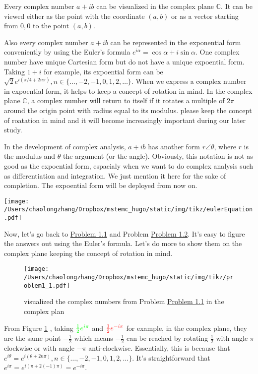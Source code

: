 \documentclass[koma,a4paper,utopia,12pt,listings-color,microtype,paralist,colorlinks,urlcolor=red]{org-article}
\begin{document}
Every complex number \(a+ib\) can be visualized in the complex plane
\(\mathbb{C}\). It can be viewed either as the point with the coordinate
\((a,b)\) or as a vector starting from \(0,0\) to the point \((a,b)\).

Also every complex number \(a+ib\) can be represented in the exponential form
conveniently by using the Euler's formula \(e^{i\alpha} = \cos\alpha +
 i\sin\alpha\). One complex number have unique Cartesian form but do not have a
unique expoential form. Taking \(1+i\) for example, its expoential form can be
\(\sqrt{2}e^{i(\pi/4 + 2n\pi)}, n\in \{ \ldots, -2,-1,0,1,2,\ldots \}\). When we
express a complex number in expoential form, it helps to keep a concept of
rotation in mind. In the complex plane \(\mathbb{C}\), a complex number will
return to itself if it rotates a multiple of \(2\pi\) around the origin point
with radius equal to its modulus. please keep the concept of roatation in mind
and it will become increasingly important during our later study.

In the development of complex analysis, \(a+ib\) has another form \(r\angle
 \theta\), where \(r\) is the modulus and \(\theta\) the argument (or the angle).
Obviously, this notation is not as good as the expoential form, espacialy when
we want to do complex analysis such as differentiation and integration. We just
mention it here for the sake of completion. The expoential form will be deployed
from now on.


\begin{center}
\texttt{[image: /Users/chaolongzhang/Dropbox/mstemc\_hugo/static/img/tikz/eulerEquation.pdf]}
\end{center}

Now, let's go back to \hyperref[prob11]{Problem 1.1} and Problem \hyperref[prob12]{Problem
1.2}. It's easy to figure the answers out using the Euler's formula. Let's do
more to show them on the complex plane keeping the concept of rotation in mind.

\begin{figure}[htbp]
\centering
\texttt{[image: /Users/chaolongzhang/Dropbox/mstemc\_hugo/static/img/tikz/problem1\_1.pdf]}
\caption{\label{problem1-1}
visualized the complex numbers from Problem \hyperref[prob11]{Problem 1.1} in the complex plan}
\end{figure}

From Figure \ref{problem1-1} , taking \(\color{green}{\tfrac{1}{2}e^{i\pi}}\) and
\(\color{red}{\tfrac{1}{2}e^{-i\pi}}\) for example, in the complex plane, they
are the same point \(-\tfrac{1}{2}\) which means \(-\tfrac{1}{2}\) can be
reached by rotating \(\tfrac{1}{2}\) with angle \(\pi\) clockwise or with angle
\(-\pi\) anti-clockwise. Essentially, this is because that \(e^{i\theta} =
 e^{i(\theta + 2n\pi)}, n\in \{\ldots,-2,-1,0,1,2,\ldots\}\). It's
straightforward that \(e^{i\pi} = e^{i(\pi + 2(-1)\pi)} = e^{-i\pi}\).
\end{document}
